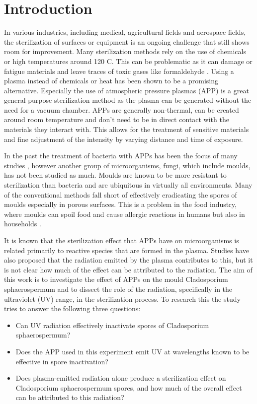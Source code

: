 \chapter{Introduction}
\label{chap:intro}
In various industries, including medical, agricultural fields and aerospace fields, the sterilization of surfaces or equipment is an ongoing challenge that still shows room for improvement. Many sterilization methods rely on the use of chemicals or high temperatures around 120 \textdegree C. This can be problematic as it can damage or fatigue materials and leave traces of toxic gases like formaldehyde \cite{app_study}. Using a plasma instead of chemicals or heat has been shown to be a promising alternative. Especially the use of atmospheric pressure plasmas (APP) is a great general-purpose sterilization method as the plasma can be generated without the need for a vacuum chamber. APPs are generally non-thermal, can be created around room temperature and don't need to be in direct contact with the materials they interact with. This allows for the treatment of sensitive materials and fine adjustment of the intensity by varying distance and time of exposure. 

In the past the treatment of bacteria with APPs has been the focus of many studies \cite{app_study,bacteria}, however another group of microorganisms, fungi, which include moulds, has not been studied as much. Moulds are known to be more resistant to sterilization than bacteria and are ubiquitous in virtually all environments. Many of the conventional methods fall short of effectively eradicating the spores of moulds especially in porous surfaces. This is a problem in the food industry, where moulds can spoil food and cause allergic reactions in humans but also in households \cite{mould, growth}.

It is known that the sterilization effect that APPs have on microorganisms is related primarily to reactive species that are formed in the plasma. Studies have also proposed that the radiation emitted by the plasma contributes to this, but it is not clear how much of the effect can be attributed to the radiation. The aim of this work is to investigate the effect of APPs on the mould Cladosporium sphaerospermum and to dissect the role of the radiation, specifically in the ultraviolet (UV) range, in the sterilization process. To research this the study tries to answer the following three questions:
\begin{itemize}
    \item Can UV radiation effectively inactivate spores of Cladosporium sphaerospermum?
    \item Does the APP used in this experiment emit UV at wavelengths known to be effective in spore inactivation?
    \item Does plasma-emitted radiation alone produce a sterilization effect on Cladosporium sphaerospermum spores, and how much of the overall effect can be attributed to this radiation?
\end{itemize}

